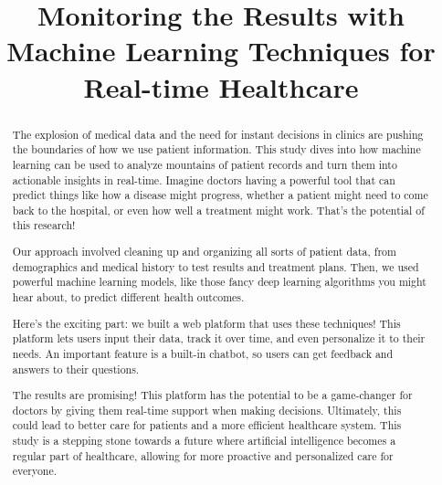 \documentclass[conference]{IEEEtran}
\begin{document}
\title{Monitoring the Results with Machine Learning Techniques for Real-time Healthcare}

\author {
    
}


\maketitle


\begin{abstract}
The explosion of medical data and the need for instant decisions in clinics are pushing the boundaries of how we use patient information. This study dives into how machine learning can be used to analyze mountains of patient records and turn them into actionable insights in real-time. Imagine doctors having a powerful tool that can predict things like how a disease might progress, whether a patient might need to come back to the hospital, or even how well a treatment might work. That's the potential of this research!

Our approach involved cleaning up and organizing all sorts of patient data, from demographics and medical history to test results and treatment plans. Then, we used powerful machine learning models, like those fancy deep learning algorithms you might hear about, to predict different health outcomes.

Here's the exciting part: we built a web platform that uses these techniques! This platform lets users input their data, track it over time, and even personalize it to their needs. An important feature is a built-in chatbot, so users can get feedback and answers to their questions.

The results are promising! This platform has the potential to be a game-changer for doctors by giving them real-time support when making decisions. Ultimately, this could lead to better care for patients and a more efficient healthcare system. This study is a stepping stone towards a future where artificial intelligence becomes a regular part of healthcare, allowing for more proactive and personalized care for everyone.
\end{abstract}
\end{document}
